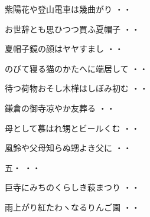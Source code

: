 \vspace{0.6cm}
\begin{shiika}紫陽花や登山電車は幾曲がり
\hfill{・・}\end{shiika}
\vspace{0.6cm}
\begin{shiika}お世辞とも思ひつつ買ふ夏帽子
\hfill{・・}\end{shiika}
\vspace{0.6cm}
\begin{shiika}夏帽子鏡の顔はヤヤすまし
\hfill{・・}\end{shiika}
\vspace{0.6cm}
\begin{shiika}のびて寝る猫のかたへに端居して
\hfill{・・}\end{shiika}
\vspace{0.6cm}
\begin{shiika}待つ荷物おそし木樺はしぼみ初む
\hfill{・・}\end{shiika}
\vspace{0.6cm}
\begin{shiika}鎌倉の御寺凉やか友葬る
\hfill{・・}\end{shiika}
\vspace{0.6cm}
\begin{shiika}母として慕はれ甥とビールくむ
\hfill{・・}\end{shiika}
\vspace{0.6cm}
\begin{shiika}風鈴や父母知らぬ甥よき父に
\hfill{・・}\end{shiika}
\vspace{0.6cm}
\begin{shiika}五・
\hfill{・・}\end{shiika}
\vspace{0.6cm}
\begin{shiika}巨寺にみちのくらしき萩まつり
\hfill{・・}\end{shiika}
\vspace{0.6cm}
\begin{shiika}雨上がり紅たわヽなるりんご園
\hfill{・・}\end{shiika}
\vspace{0.6cm}
